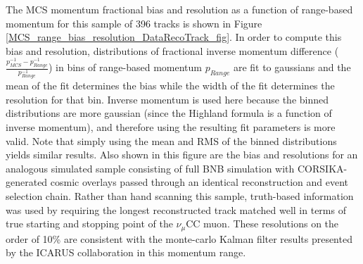 \documentclass[a4paper,11pt]{article}
\begin{document}
The MCS momentum fractional bias and resolution as a function of range-based momentum for this sample of 396 tracks is shown in Figure \ref{MCS_range_bias_resolution_DataRecoTrack_fig}. In order to compute this bias and resolution, distributions of fractional inverse momentum difference ($\frac{p_{MCS}^{-1} - p_{Range}^{-1}}{p_{Range}^{-1}}$) in bins of range-based momentum $p_{Range}$ are fit to gaussians and the mean of the fit determines the bias while the width of the fit determines the resolution for that bin. Inverse momentum is used here because the binned distributions are more gaussian (since the Highland formula is a function of inverse momentum), and therefore using the resulting fit parameters is more valid. Note that simply using the mean and RMS of the binned distributions yields similar results. Also shown in this figure are the bias and resolutions for an analogous simulated sample consisting of full BNB simulation with CORSIKA-generated\cite{corsika_ref} cosmic overlays passed through an identical reconstruction and event selection chain. Rather than hand scanning this sample, truth-based information was used by requiring the longest reconstructed track matched well in terms of true starting and stopping point of the $\nu_\mu$CC muon. These resolutions on the order of 10\% are consistent with the monte-carlo Kalman filter results presented by the ICARUS collaboration in this momentum range\cite{icarus_mcs_paper}.\\
\end{document}
